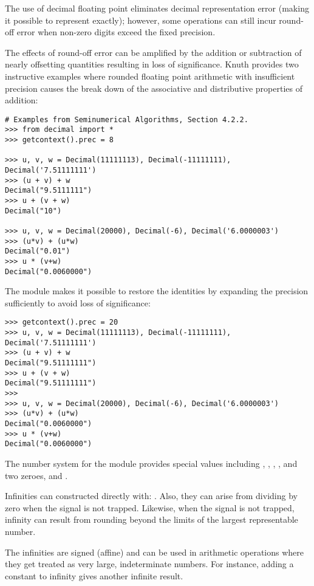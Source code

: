 The use of decimal floating point eliminates decimal representation error
(making it possible to represent  exactly); however, some
operations can still incur round-off error when non-zero digits exceed the
fixed precision.

The effects of round-off error can be amplified by the addition or subtraction
of nearly offsetting quantities resulting in loss of significance.  Knuth
provides two instructive examples where rounded floating point arithmetic with
insufficient precision causes the break down of the associative and
distributive properties of addition:

\begin{verbatim}
# Examples from Seminumerical Algorithms, Section 4.2.2.
>>> from decimal import *
>>> getcontext().prec = 8

>>> u, v, w = Decimal(11111113), Decimal(-11111111), Decimal('7.51111111')
>>> (u + v) + w
Decimal("9.5111111")
>>> u + (v + w)
Decimal("10")

>>> u, v, w = Decimal(20000), Decimal(-6), Decimal('6.0000003')
>>> (u*v) + (u*w)
Decimal("0.01")
>>> u * (v+w)
Decimal("0.0060000")
\end{verbatim}

The  module makes it possible to restore the identities
by expanding the precision sufficiently to avoid loss of significance:

\begin{verbatim}
>>> getcontext().prec = 20
>>> u, v, w = Decimal(11111113), Decimal(-11111111), Decimal('7.51111111')
>>> (u + v) + w
Decimal("9.51111111")
>>> u + (v + w)
Decimal("9.51111111")
>>> 
>>> u, v, w = Decimal(20000), Decimal(-6), Decimal('6.0000003')
>>> (u*v) + (u*w)
Decimal("0.0060000")
>>> u * (v+w)
Decimal("0.0060000")
\end{verbatim}


The number system for the  module provides special
values including , , ,
, and two zeroes,  and .

Infinities can constructed directly with:  . Also,
they can arise from dividing by zero when the 
signal is not trapped.  Likewise, when the  signal is not
trapped, infinity can result from rounding beyond the limits of the largest
representable number.

The infinities are signed (affine) and can be used in arithmetic operations
where they get treated as very large, indeterminate numbers.  For instance,
adding a constant to infinity gives another infinite result.

